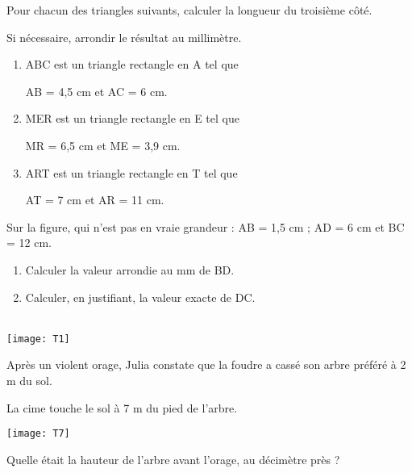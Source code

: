 

\begin{exercice}
Pour chacun des triangles suivants, calculer la longueur du troisième côté.

Si nécessaire, arrondir le résultat au millimètre.

\begin{enumerate}
\item ABC est un triangle rectangle en A tel que

AB = 4,5 cm et AC = 6 cm.
\item MER est un triangle rectangle en E tel que

MR = 6,5 cm et ME = 3,9 cm.
\item ART est un triangle rectangle en T tel que

AT = 7 cm et AR = 11 cm.
\end{enumerate}

\end{exercice}


\begin{exercice}
Sur la figure, qui n’est pas en vraie grandeur : AB = 1,5 cm ; AD = 6 cm et  BC = 12 cm.

\begin{minipage}{0.6\linewidth}

\begin{enumerate}
\item Calculer la valeur arrondie au mm de BD.

\item Calculer, en justifiant, la valeur exacte de DC.\\\\

\end{enumerate}

\end{minipage}
\hfill
\begin{minipage}{0.3\linewidth}
\begin{center}
\texttt{[image: T1]}
\end{center}
\end{minipage}
\end{exercice}


\begin{exercice}
Après un violent orage, Julia constate que la foudre a cassé son arbre préféré à 2 m du sol.

La cime touche le sol à 7 m du pied de l’arbre.

\begin{center}
\texttt{[image: T7]}
\end{center}
Quelle était la hauteur de l'arbre avant l'orage, au décimètre près ?

\end{exercice}

